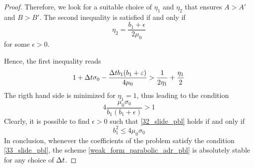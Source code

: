 \begin{proof}
    Therefore, we look for a suitable choice of \(\eta_1\) and \(\eta_2\) that ensures \(A > A'\) and \(B > B'\). The second inequality is satisfied if and only if 
    \[
        \eta_2 = \frac{b_1 +\epsilon}{2\mu_0} 
    \]
    for some \(\epsilon > 0\).
    

    Hence, the first inequality reads 
    \[
        1 + \Delta t \sigma_0 -\frac{\Delta t b_1(b_1 + \varepsilon)}{4\mu_0} > \frac{1}{2\eta_1} + \frac{\eta_1}{2}
    \]
    The rigth hand side is minimized for \(\eta_1 = 1\), thus leading to the condition 
    \begin{equation}
        4\frac{\mu_0\sigma_0}{b_1(b_1+\epsilon)} > 1
        \label{32_slide_pbl}
    \end{equation}
    Clearly, it is possible to find \(\epsilon > 0\) such that \eqref{32_slide_pbl} holds if and only if
    \begin{equation}
        b_1^2 \leq 4\mu_0\sigma_0
        \label{33_slide_pbl}
    \end{equation}
    In conclusion, whenever the coefficients of the problem satisfy the condition \eqref{33_slide_pbl}, the scheme \eqref{weak_form_parabolic_adr_pbl} is absolutely stable for any choice of \(\Delta t\).


\end{proof}
